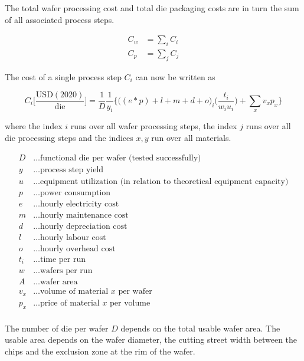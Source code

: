 \documentclass[10pt]{article}
\begin{document}
The total wafer processing cost and total die packaging costs are in turn the sum of all associated process steps.

\begin{align}
	C_w &= \sum_i C_i \\
	C_p &= \sum_j C_j
\end{align}

The cost of a single process step $C_i$ can now be written as

\begin{equation}
\label{eqn:cost_wafer}
    C_i \bigg[ \frac{ \text{USD}(2020) }{ \text{die} } \bigg] =\frac{1}{D}  \frac{1}{y_i}   \bigg\{ \bigg((e*p) + l + m + d +o \bigg)_i \bigg( \frac{t_i}{w_i u_i} \bigg) + \sum_{x} v_x p_x \bigg\}
\end{equation}

where the index $i$ runs over all wafer processing steps, the index $j$ runs over all die processing steps and the indices $x,y$ run over all materials.

\begin{align*}
        D &\dots \text{functional die per wafer (tested successfully)} \label{def:cost_wafer_first} \\
        y &\dots \text{process step yield} \\
        u &\dots \text{equipment utilization (in relation to theoretical equipment capacity)} \\
        p &\dots \text{power consumption} \\
        e &\dots \text{hourly electricity cost} \\
        m &\dots \text{hourly maintenance cost} \\
        d &\dots \text{hourly depreciation cost}\\
        l &\dots \text{hourly labour cost} \\
        o &\dots \text{hourly overhead cost} \\
        t_i &\dots \text{time per run} \\
        w &\dots \text{wafers per run} \\
        A &\dots \text{wafer area} \\
        v_x &\dots \text{volume of material $x$ per wafer} \\
        p_x &\dots \text{price of material $x$ per volume}\\
\end{align*}

The number of die per wafer $D$ depends on the total usable wafer area. The usable area depends on the wafer diameter, the cutting street width between the chips and the exclusion zone at the rim of the wafer.
\end{document}
